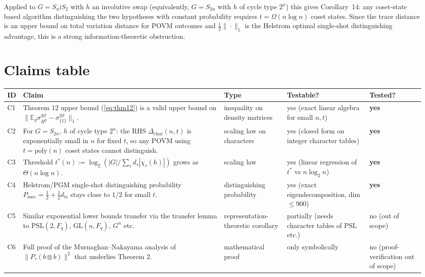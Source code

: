 \documentclass[11pt]{article}
\begin{document}
Applied to $G = S_n \wr S_2$ with $h$ an involutive swap (equivalently,
$G = S_{2n}$ with $h$ of cycle type $2^n$) this gives Corollary~14:
any coset-state based algorithm distinguishing the two hypotheses
with constant probability requires $t = \Omega(n \log n)$ coset
states.  Since the trace distance is an upper bound on total variation
distance for POVM outcomes and $\tfrac12\|\cdot\|_1$ is the Helstrom
optimal single-shot distinguishing advantage, this is a strong
information-theoretic obstruction.

\section{Claims table}
\label{sec:claims}

\begin{longtable}{@{}p{}p{}p{}p{}p{}@{}}
\toprule
\textbf{ID} & \textbf{Claim} & \textbf{Type} & \textbf{Testable?} & \textbf{Tested?}\\
\midrule
C1 & Theorem 12 upper bound (\ref{eq:thm12}) is a valid upper bound on
     $\| \mathbb{E}_g \sigma_{H^g}^{\otimes t} - \sigma_{\{1\}}^{\otimes t} \|_1$. &
     inequality on density matrices & yes (exact linear algebra for small $n,t$) &
     \textbf{yes} \\
C2 & For $G = S_{2n}$, $h$ of cycle type $2^n$: the RHS
     $\Delta_{\text{char}}(n,t)$ is exponentially small in $n$ for fixed
     $t$, so any POVM using $t = \mathrm{poly}(n)$ coset states cannot
     distinguish. & scaling law on characters & yes (closed form on
     integer character tables) & \textbf{yes} \\
C3 & Threshold $t^*(n) := \log_2(|G|/\sum_\tau d_\tau|\chi_\tau(h)|)$
     grows as $\Theta(n \log n)$. & scaling law &
     yes (linear regression of $t^*$ vs $n\log_2 n$) & \textbf{yes} \\
C4 & Helstrom/PGM single-shot distinguishing probability
     $P_{\text{succ}} = \tfrac12 + \tfrac12 d_{\mathrm{tr}}$ stays
     close to $1/2$ for small $t$. & distinguishing probability &
     yes (exact eigendecomposition, dim $\le 900$) & \textbf{yes} \\
C5 & Similar exponential lower bounds transfer via the transfer lemma
     to $\mathrm{PSL}(2, F_q)$, $\mathrm{GL}(n, F_q)$, $G^n$ etc. &
     representation-theoretic corollary & partially (needs character
     tables of $\mathrm{PSL}$ etc.) & no (out of scope) \\
C6 & Full proof of the Murnaghan--Nakayama analysis of
     $\|P_\tau (b \otimes b)\|^2$ that underlies Theorem 2. &
     mathematical proof & only symbolically & no (proof-verification
     out of scope) \\
\bottomrule
\end{longtable}
\end{document}
